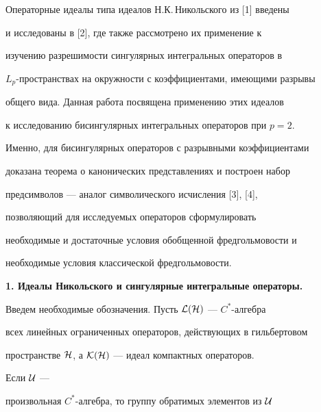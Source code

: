  




\maketitle 


\label{begin} 


 


 


 


Операторные идеалы типа идеалов Н.К.\,Никольского из [1] введены 


и исследованы в [2], где также рассмотрено их применение к 


изучению разрешимости сингулярных интегральных операторов в 


$L_p$-пространствах на окружности с коэффициентами, имеющими разрывы 


общего вида. Данная работа посвящена применению этих идеалов 


к исследованию бисингулярных интегральных операторов при $p=2$. 


Именно, для бисингулярных операторов с разрывными коэффициентами 


доказана теорема о канонических представлениях и построен набор 


предсимволов --- аналог символического исчисления [3], [4], 


позволяющий для исследуемых операторов сформулировать 


необходимые и достаточные условия обобщенной фредгольмовости и 


необходимые условия классической фредгольмовости. 


\medskip 


 


{\bf 1. Идеалы Никольского и сингулярные интегральные операторы.} 


Введем необходимые обозначения. Пусть $\cal L(\cal H)$ --- $C^*$-алгебра 


всех линейных ограниченных операторов, действующих в гильбертовом 


пространстве $\cal H$, а $\cal K(\cal H)$ --- идеал компактных операторов. 


Если $\cal U$ --- 


произвольная $C^*$-алгебра, то группу обратимых элементов из $\cal U$ 


